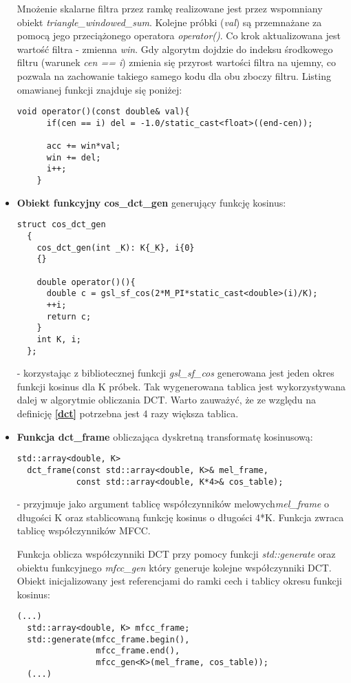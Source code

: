 \begin{itemize}
 Mnożenie skalarne filtra przez ramkę realizowane jest przez wspomniany obiekt \textit{triangle\_windowed\_sum}. Kolejne próbki (\textit{val}) są przemnażane za pomocą jego przeciążonego operatora \textit{operator()}. Co krok aktualizowana jest wartość filtra - zmienna \textit{win}. Gdy algorytm dojdzie do indeksu środkowego filtru (warunek \textit{cen == i}) zmienia się przyrost wartości filtra na ujemny, co pozwala na zachowanie takiego samego kodu dla obu zboczy filtru. Listing omawianej funkcji znajduje się poniżej:
 \begin{lstlisting}[style=lst:cpp]
    void operator()(const double& val){
      if(cen == i) del = -1.0/static_cast<float>((end-cen));

      acc += win*val;
      win += del;
      i++;
    }
 \end{lstlisting}

\item{\textbf{Obiekt funkcyjny cos\_dct\_gen} generujący funkcję kosinus:
 \begin{lstlisting}[style=lst:cpp]
  struct cos_dct_gen
  {
    cos_dct_gen(int _K): K{_K}, i{0}
    {}

    double operator()(){
      double c = gsl_sf_cos(2*M_PI*static_cast<double>(i)/K);
      ++i;
      return c;
    }
    int K, i;
  };
\end{lstlisting}
}
- korzystając z bibliotecznej funkcji \textit{gsl\_sf\_cos} generowana jest jeden okres funkcji kosinus dla K próbek. Tak wygenerowana tablica jest wykorzystywana dalej w algorytmie obliczania DCT. Warto zauważyć, że ze względu na definicję \textbf{\ref{dct}} potrzebna jest 4 razy większa tablica.


\item{\textbf{Funkcja dct\_frame} obliczająca dyskretną transformatę kosinusową:
 \begin{lstlisting}[style=lst:cpp]
  std::array<double, K>
  dct_frame(const std::array<double, K>& mel_frame,
            const std::array<double, K*4>& cos_table);
\end{lstlisting}
}
- przyjmuje jako argument tablicę współczynników melowych\textit{mel\_frame} o długości K oraz stablicowaną funkcję kosinus o długości 4*K. Funkcja zwraca tablicę współczynników MFCC.

  Funkcja oblicza współczynniki DCT przy pomocy funkcji \textit{std::generate} oraz obiektu funkcyjnego \textit{mfcc\_gen} który generuje kolejne współczynniki DCT. Obiekt inicjalizowany jest referencjami do ramki cech i tablicy okresu funkcji kosinus:
 \begin{lstlisting}[style=lst:cpp]
 (...)
  std::array<double, K> mfcc_frame;
  std::generate(mfcc_frame.begin(),
                mfcc_frame.end(),
                mfcc_gen<K>(mel_frame, cos_table));
  (...)
\end{lstlisting}


\end{itemize}
